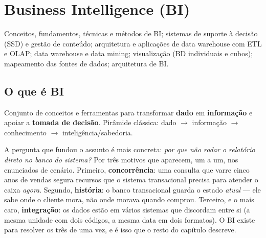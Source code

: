 \chapter{Business Intelligence (BI)}
\label{cap:bi}

\begin{edital}
Conceitos, fundamentos, técnicas e métodos de BI; sistemas de suporte à
decisão (SSD) e gestão de conteúdo; arquitetura e aplicações de data
warehouse com ETL e OLAP; data warehouse e data mining; visualização (BD
individuais e cubos); mapeamento das fontes de dados; arquitetura de BI.
\end{edital}

\section{O que é BI}

Conjunto de conceitos e ferramentas para transformar \textbf{dado} em
\textbf{informação} e apoiar a \textbf{tomada de decisão}. Pirâmide clássica:
dado $\to$ informação $\to$ conhecimento $\to$ inteligência/sabedoria.

A pergunta que fundou o assunto é mais concreta: \emph{por que não rodar o
relatório direto no banco do sistema?} Por três motivos que aparecem, um a um,
nos enunciados de cenário. Primeiro, \textbf{concorrência}: uma consulta que
varre cinco anos de vendas segura recursos que o sistema transacional precisa
para atender o caixa \emph{agora}. Segundo, \textbf{história}: o banco
transacional guarda o estado \emph{atual} --- ele sabe onde o cliente mora, não
onde morava quando comprou. Terceiro, e o mais caro, \textbf{integração}: os
dados estão em vários sistemas que discordam entre si (a mesma unidade com dois
códigos, a mesma data em dois formatos). O BI existe para resolver os três de
uma vez, e é isso que o resto do capítulo descreve.

